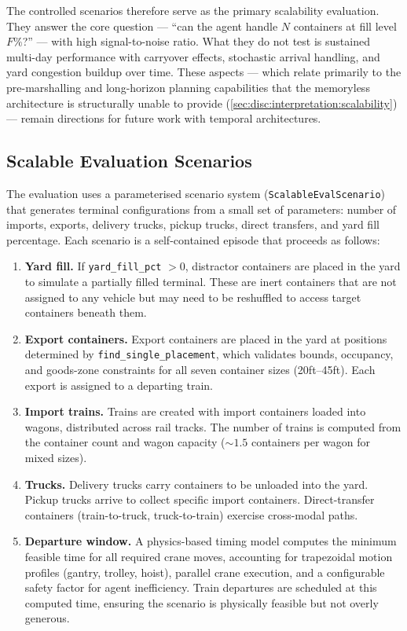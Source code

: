 The controlled scenarios therefore serve as the primary scalability evaluation. They answer the core question --- ``can the agent handle $N$ containers at fill level $F\%$?'' --- with high signal-to-noise ratio. What they do not test is sustained multi-day performance with carryover effects, stochastic arrival handling, and yard congestion buildup over time. These aspects --- which relate primarily to the pre-marshalling and long-horizon planning capabilities that the memoryless architecture is structurally unable to provide (\cref{sec:disc:interpretation:scalability}) --- remain directions for future work with temporal architectures.

\subsection{Scalable Evaluation Scenarios}
\label{sec:exp:phase2:scenarios}

The evaluation uses a parameterised scenario system (\texttt{ScalableEvalScenario}) that generates terminal configurations from a small set of parameters: number of imports, exports, delivery trucks, pickup trucks, direct transfers, and yard fill percentage. Each scenario is a self-contained episode that proceeds as follows:

\begin{enumerate}
  \small
  \item \textbf{Yard fill.} If \texttt{yard\_fill\_pct} $> 0$, distractor containers are placed in the yard to simulate a partially filled terminal. These are inert containers that are not assigned to any vehicle but may need to be reshuffled to access target containers beneath them.
  \item \textbf{Export containers.} Export containers are placed in the yard at positions determined by \texttt{find\_single\_placement}, which validates bounds, occupancy, and goods-zone constraints for all seven container sizes (20ft--45ft). Each export is assigned to a departing train.
  \item \textbf{Import trains.} Trains are created with import containers loaded into wagons, distributed across rail tracks. The number of trains is computed from the container count and wagon capacity (${\sim}1.5$ containers per wagon for mixed sizes).
  \item \textbf{Trucks.} Delivery trucks carry containers to be unloaded into the yard. Pickup trucks arrive to collect specific import containers. Direct-transfer containers (train-to-truck, truck-to-train) exercise cross-modal paths.
  \item \textbf{Departure window.} A physics-based timing model computes the minimum feasible time for all required crane moves, accounting for trapezoidal motion profiles (gantry, trolley, hoist), parallel crane execution, and a configurable safety factor for agent inefficiency. Train departures are scheduled at this computed time, ensuring the scenario is physically feasible but not overly generous.
\end{enumerate}

